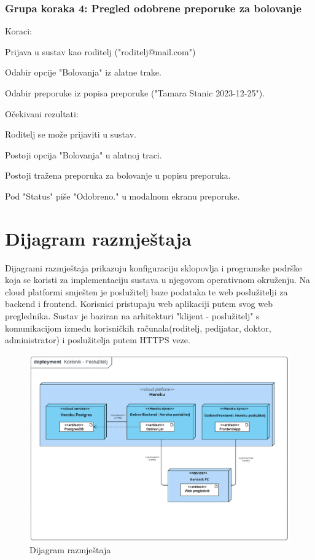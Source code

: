 			 \subsubsection*{Grupa koraka 4: Pregled odobrene preporuke za bolovanje}
			 Koraci:
			 \begin{packed_enum}
				\item Prijava u sustav kao roditelj ("roditelj@mail.com")
				\item Odabir opcije "Bolovanja" iz alatne trake.
				\item Odabir preporuke iz popisa preporuke ("Tamara Stanic 2023-12-25").
			 \end{packed_enum}
			 Očekivani rezultati:
			 \begin{packed_enum}
				\item Roditelj se može prijaviti u sustav.
				\item Postoji opcija "Bolovanja" u alatnoj traci.
				\item Postoji tražena preporuka za bolovanje u popisu preporuka.
				\item Pod "Status" piše "Odobreno." u modalnom ekranu preporuke.
			 \end{packed_enum}
			\eject
		
		\section{Dijagram razmještaja}
			Dijagrami razmještaja prikazuju konfiguraciju sklopovlja i programske podrške koja se koristi za implementaciju sustava u njegovom operativnom okruženju. Na cloud platformi smješten je poslužitelj baze podataka te web poslužitelji za backend i frontend. Korisnici pristupaju web aplikaciji putem svog web preglednika. Sustav je baziran na arhitekturi "klijent - poslužitelj" s komunikacijom između korisničkih računala(roditelj, pedijatar, doktor, administrator) i poslužitelja putem HTTPS veze.
			\begin{figure}[H]
				\includegraphics[width=\textwidth]{slike/deploymentDiagram.png} 
				\caption{Dijagram razmještaja} 
			\end{figure}
			\eject 
		
